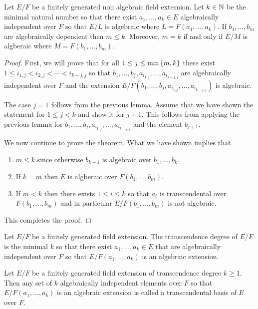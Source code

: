 \documentclass[11pt,a4paper]{article}
\begin{document}
\begin{proposition}
  Let $E/F$ be a finitely generated non algebraic field extesnion.
  Let $k \in \mathbb{N}$ be the minimal natural number so that
  there exist $a_1,\dots,a_k \in E$ algebraically independent over $F$
  so that $E/L$ is algebraic where $L = F(a_1,\dots,a_k)$.
  If $b_1,\dots,b_m$ are algebraically dependent then $m \le k$.
  Moreover, $m = k$ if and only if $E/M$ is algberaic where
  $M = F(b_1,\dots,b_m)$.
\end{proposition}
\begin{proof}
  First, we will prove that for all $1 \le j \le \min\left\{m,k\right\}$ there
  exist $1 \le i_{1,j} < i_{2,j} < \cdots < i_{k-j,j}$ so that
  $b_1,\dots,b_j,a_{i_{1,j}},\dots,a_{i_{k-j,j}}$
  are algebraically independent over $F$
  and the extension
  $E/F(b_1,\dots,b_j,a_{i_{1,j}},\dots,a_{i_{k-j,j}})$ is algebraic.

  The case $j = 1$ follows from the previous lemma.
  Assume that we have shown the statement for $1 \le j < k$
  and show it for $j + 1$.
  This follows from applying the previous lemma for
  $b_1,\dots,b_j,a_{i_{1,j}},\dots,a_{i_{k-j,j}}$
  and the element $b_{j+1}$.

  We now continue to prove the theorem.
  What we have shown implies that
  \begin{enumerate}
    \item[(1)] $m \le k$ since otherwise $b_{k+1}$ is algebraic over
      $b_1,\dots,b_k$.
    \item[(2)] If $k = m$ then $E$ is algberaic over
      $F(b_1,\dots,b_m)$.
    \item[(3)] If $m < k$ then there exists $1 \le i \le k$
      so that $a_i$ is transcendental over $F(b_1,\dots,b_m)$
      and in particular $E/F(b_1,\dots,b_m)$ is not algebraic.
  \end{enumerate}
  This completes the proof.
\end{proof}

\begin{definition}
  Let $E/F$ be a finitely generated field extension.
  The transcendence degree
  of $E/F$ is the minimal $k$ so that there exist $a_1,\dots,a_k \in E$
  that are algebraically independent over $F$
  so that $E/F(a_1,\dots,a_k)$ is an algebraic extension.
\end{definition}

\begin{definition}
  Let $E/F$ be a finitely generated field extension of
  transcendence degree $k \geq 1$.
  Then any set of $k$ algebraically independent elements over $F$
  so that $E/F(a_1,\dots,a_k)$ is an algebraic extension
  is called a transcendental basis of $E$ over $F$.
\end{definition}
\end{document}
